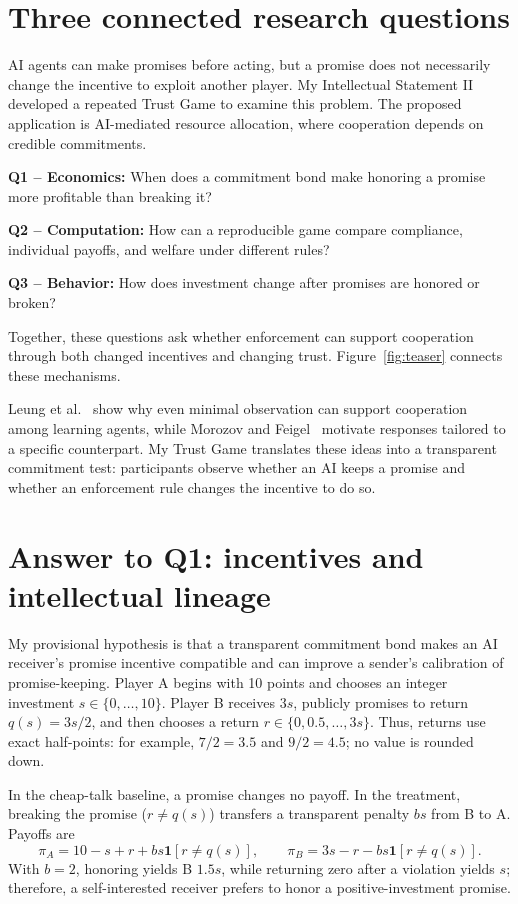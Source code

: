 \section{Three connected research questions}

AI agents can make promises before acting, but a promise
does not necessarily change the incentive to exploit
another player. My Intellectual Statement II developed
a repeated Trust Game to examine this problem.
The proposed application is AI-mediated resource
allocation, where cooperation depends on credible
commitments.

\textbf{Q1 -- Economics:}
When does a commitment bond make honoring a promise
more profitable than breaking it?

\textbf{Q2 -- Computation:}
How can a reproducible game compare compliance,
individual payoffs, and welfare under different rules?

\textbf{Q3 -- Behavior:}
How does investment change after promises are honored
or broken?

Together, these questions ask whether enforcement can
support cooperation through both changed incentives
and changing trust. Figure~\ref{fig:teaser} connects
these mechanisms.

Leung et al.~\cite{leung2026} show why even minimal observation can support cooperation among learning agents, while Morozov and Feigel~\cite{morozov2026} motivate responses tailored to a specific counterpart. My Trust Game translates these ideas into a transparent commitment test: participants observe whether an AI keeps a promise and whether an enforcement rule changes the incentive to do so.

\section{Answer to Q1: incentives and intellectual lineage}

My provisional hypothesis is that a transparent commitment bond makes an AI receiver's promise incentive compatible and can improve a sender's calibration of promise-keeping. Player A begins with 10 points and chooses an integer investment $s\in\{0,\ldots,10\}$. Player B receives $3s$, publicly promises to return $q(s)=3s/2$, and then chooses a return $r\in\{0,0.5,\ldots,3s\}$. Thus, returns use exact half-points: for example, $7/2=3.5$ and $9/2=4.5$; no value is rounded down.

In the cheap-talk baseline, a promise changes no payoff. In the treatment, breaking the promise ($r\neq q(s)$) transfers a transparent penalty $bs$ from B to A. Payoffs are
\[
\pi_A=10-s+r+bs\mathbf{1}[r\neq q(s)],\qquad
\pi_B=3s-r-bs\mathbf{1}[r\neq q(s)].
\]
With $b=2$, honoring yields B $1.5s$, while returning zero after a violation yields $s$; therefore, a self-interested receiver prefers to honor a positive-investment promise.

